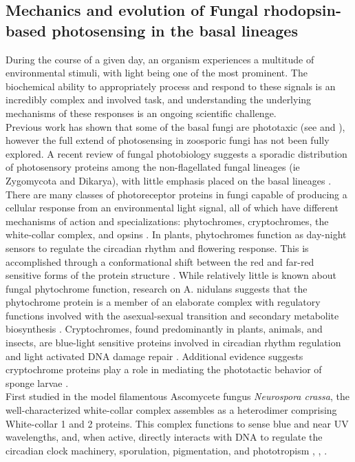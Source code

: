 \subsection*{Mechanics and evolution of Fungal rhodopsin-based photosensing in the basal lineages}
\indent During the course of a given day, an organism experiences a multitude of environmental stimuli, with light being one of the most prominent. The biochemical ability to appropriately process and respond to these signals is an incredibly complex and involved task, and understanding the underlying mechanisms of these responses is an ongoing scientific challenge. \\
\indent Previous work has shown that some of the basal fungi are phototaxic (see \cite{Saranak1997} and \cite{Muehlstein1987}), however the full extend of photosensing in zoosporic fungi has not been fully explored. A recent review of fungal photobiology suggests a sporadic distribution of photosensory proteins among the non-flagellated fungal lineages (ie Zygomycota and Dikarya), with little emphasis placed on the basal lineages \cite{Idnurm2010}. There are many classes of photoreceptor proteins in fungi capable of producing a cellular response from an environmental light signal, all of which have different mechanisms of action and specializations: phytochromes, cryptochromes, the white-collar complex, and opsins \cite{Idnurm2010}. In plants, phytochromes function as day-night sensors to regulate the circadian rhythm and flowering response. This is accomplished through a conformational shift between the red and far-red sensitive forms of the protein structure \cite{Rockwell2006}. While relatively little is known about fungal phytochrome function, research on A. nidulans suggests that the phytochrome protein is a member of an elaborate complex with regulatory functions involved with the asexual-sexual transition and secondary metabolite biosynthesis \cite{Idnurm2010}. Cryptochromes, found predominantly in plants, animals, and insects, are blue-light sensitive proteins involved in circadian rhythm regulation and light activated DNA damage repair \cite{Idnurm et al. 2010}. Additional evidence suggests cryptochrome proteins play a role in mediating the phototactic behavior of sponge larvae \cite{Rivera2012}.\\
\indent First studied in the model filamentous Ascomycete fungus \textit{Neurospora crassa}, the well-characterized white-collar complex assembles as a heterodimer comprising White-collar 1 and 2 proteins. This complex functions to sense blue and near UV wavelengths, and, when active, directly interacts with DNA to regulate the circadian clock machinery, sporulation, pigmentation, and phototropism \cite{Ballario1997}, \cite{Purschwitz2006}, \cite{Corrochano2007}. \\

